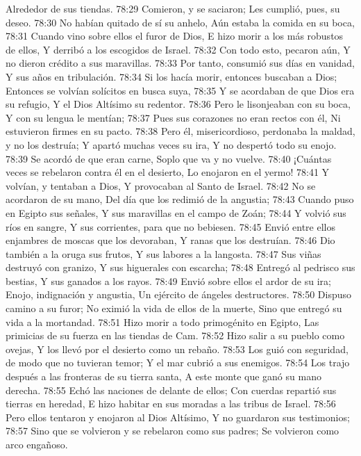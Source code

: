 Alrededor de sus tiendas. 
78:29 Comieron, y se saciaron; 
Les cumplió, pues, su deseo. 
78:30 No habían quitado de sí su anhelo, 
Aún estaba la comida en su boca, 
78:31 Cuando vino sobre ellos el furor de Dios, 
E hizo morir a los más robustos de ellos, 
Y derribó a los escogidos de Israel. 
78:32 Con todo esto, pecaron aún, 
Y no dieron crédito a sus maravillas. 
78:33 Por tanto, consumió sus días en vanidad, 
Y sus años en tribulación. 
78:34 Si los hacía morir, entonces buscaban a Dios; 
Entonces se volvían solícitos en busca suya, 
78:35 Y se acordaban de que Dios era su refugio, 
Y el Dios Altísimo su redentor. 
78:36 Pero le lisonjeaban con su boca, 
Y con su lengua le mentían; 
78:37 Pues sus corazones no eran rectos con él, 
Ni estuvieron firmes en su pacto. 
78:38 Pero él, misericordioso, perdonaba la maldad, y no los destruía; 
Y apartó muchas veces su ira, 
Y no despertó todo su enojo. 
78:39 Se acordó de que eran carne, 
Soplo que va y no vuelve. 
78:40 ¡Cuántas veces se rebelaron contra él en el desierto, 
Lo enojaron en el yermo! 
78:41 Y volvían, y tentaban a Dios, 
Y provocaban al Santo de Israel. 
78:42 No se acordaron de su mano, 
Del día que los redimió de la angustia; 
78:43 Cuando puso en Egipto sus señales, 
Y sus maravillas en el campo de Zoán; 
78:44 Y volvió sus ríos en sangre, 
Y sus corrientes, para que no bebiesen. 
78:45 Envió entre ellos enjambres de moscas  que los devoraban, 
Y ranas que los destruían. 
78:46 Dio también a la oruga sus frutos, 
Y sus labores a la langosta. 
78:47 Sus viñas destruyó con granizo, 
Y sus higuerales con escarcha; 
78:48 Entregó al pedrisco sus bestias, 
Y sus ganados a los rayos. 
78:49 Envió sobre ellos el ardor de su ira; 
Enojo, indignación y angustia, 
Un ejército de ángeles destructores. 
78:50 Dispuso camino a su furor; 
No eximió la vida de ellos de la muerte, 
Sino que entregó su vida a la mortandad. 
78:51 Hizo morir a todo primogénito en Egipto, 
Las primicias de su fuerza en las tiendas de Cam. 
78:52 Hizo salir a su pueblo como ovejas, 
Y los llevó por el desierto como un rebaño. 
78:53 Los guió con seguridad, de modo que no tuvieran temor; 
Y el mar cubrió a sus enemigos. 
78:54 Los trajo después a las fronteras de su tierra santa, 
A este monte que ganó su mano derecha. 
78:55 Echó las naciones de delante de ellos; 
Con cuerdas repartió sus tierras en heredad, 
E hizo habitar en sus moradas a las tribus de Israel. 
78:56 Pero ellos tentaron y enojaron al Dios Altísimo, 
Y no guardaron sus testimonios; 
78:57 Sino que se volvieron y se rebelaron como sus padres; 
Se volvieron como arco engañoso. 
